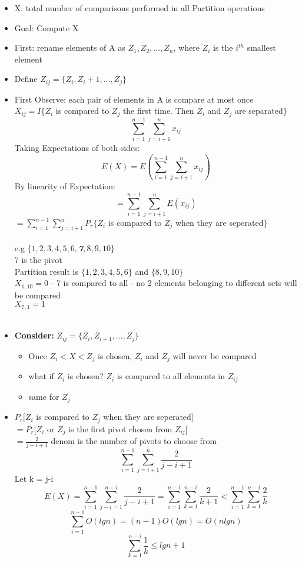 \documentclass{article}
\begin{document}
	\begin{itemize}
		\item X: total number of comparisons performed in all Partition operations
		\item Goal: Compute X
		\item First: rename elements of A as $Z_1, Z_2, ..., Z_n$, where $Z_i$ is the $i^{th}$ smallest element
		\item Define $Z_{ij} = \{Z_i, Z_i+1,...,Z_j\}$
		\item First Observe: each pair of elements in A is compare at most once\\
		$X_{ij} = I\{Z_i$ is compared to $Z_j$ the first time. Then $Z_i$ and $Z_j$ are separated$\}$
		$$\sum_{i=1}^{n-1}\sum_{j=i+1}^{n}x_{ij}$$
		Taking Expectations of both sides:
		$$E(X) = E(\sum_{i=1}^{n-1}\sum_{j=i+1}^{n}x_{ij})$$
		By linearity of Expectation:
		$$ = \sum_{i=1}^{n-1}\sum_{j=i+1}^{n}E(x_{ij})$$
		$ = \sum_{i=1}^{n-1}\sum_{j=i+1}^{n}P_r\{Z_i$ is compared to $Z_j$ when they are seperated$\}$\\\\
		e.g $\{1, 2, 3, 4, 5, 6, $\textbf{\emph{7}}$, 8, 9, 10\}$\\
		7 is the pivot\\
		Partition result is $\{1, 2, 3, 4, 5, 6\}$ and $\{8, 9, 10\}$\\
		$X_{1,10} = 0$ - 7 is compared to all - no 2 elements belonging to different sets will be compared\\
		$X_{7,1} = 1$\\\\
		\item \textbf{Consider: }$Z_{ij} = \{Z_i, Z_{i+1}, ..., Z_j\}$\\
		\begin{itemize}
			\item Once $Z_i < X < Z_j$ is chosen, $Z_i$ and $Z_j$ will never be compared\\
			\item what if $Z_i$ is chosen? $Z_i$ is compared to all elements in $Z_{ij}$
			\item same for $Z_j$
		\end{itemize}
		\item $P_r[Z_i$ is compared to $Z_j$ when they are seperated$]$\\
		$= P_r[Z_i$ or $Z_j$ is the first pivot chosen from $Z_{ij}]$\\
		$= \frac{2}{j-i+1}$ denom is the number of pivots to choose from\\
		$$\sum_{i=1}^{n-1}\sum_{j=i+1}^{n}\frac{2}{j-i+1}$$
		Let k = j-i
		$$E(X) = \sum_{i=1}^{n-1}\sum_{j-i=1}^{n-i}\frac{2}{j-i+1} = \sum_{i=1}^{n-1}\sum_{k=1}^{n-i} \frac{2}{k+1} < \sum_{i=1}^{n-1}\sum_{k=1}^{n-i} \frac{2}{k}$$
		$$ \sum_{i=1}^{n-1} O(lg n) = (n-1)O(lgn) = O(nlgn)$$
		$$\sum_{k=1}^{n-i}\frac{1}{k} \le lgn + 1$$
	\end{itemize}
	~\\\\
\end{document}
